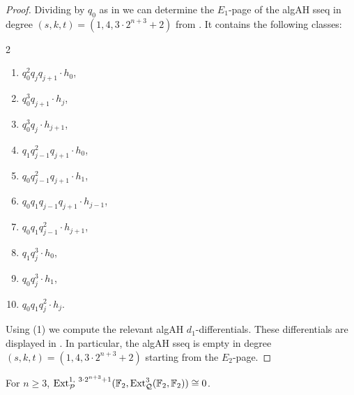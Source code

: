 \begin{proof}
  Dividing by $q_0$ as in  we can determine
  the $E_1$-page of the algAH sseq in degree $(s,k,t) = (1,4,3 \cdot 2^{n+3} + 2)$
  from .
  It contains the following classes:
  \begin{multicols}{2}
    \begin{enumerate}
    \item $q_0^2q_{j}q_{j+1} \cdot h_0$,
    \item $q_0^3q_{j+1} \cdot h_{j}$,
    \item $q_0^3q_{j} \cdot h_{j+1}$,
    \item $q_1q_{j-1}^2q_{j+1} \cdot h_0$,
    \item $q_0q_{j-1}^2q_{j+1} \cdot h_1$,
    \item $q_0q_1q_{j-1}q_{j+1} \cdot h_{j-1}$,
    \item $q_0q_1q_{j-1}^2 \cdot h_{j+1}$,
    \item $q_1q_{j}^3 \cdot h_{0}$,
    \item $q_0q_{j}^3 \cdot h_{1}$,
    \item $q_0q_1q_{j}^2 \cdot h_{j}$.
    \end{enumerate}
  \end{multicols}
  Using (1) we compute the relevant algAH $d_1$-differentials.
  These differentials are displayed in .
  In particular, the algAH sseq is empty in degree $(s,k,t) = (1,4,3 \cdot 2^{n+3} + 2)$ starting from the $E_2$-page.  
\end{proof}

\begin{lem}  \label{lem:skt131}
For $n\geq 3$,  $\operatorname{\mathrm{Ext}}^{1,\ 3\cdot 2^{n+3} + 1}_{\mathcal{P}}(\operatorname{\mathbb{F}}_2, \operatorname{\mathrm{Ext}}_{\mathcal{Q}}^3(\operatorname{\mathbb{F}}_2, \operatorname{\mathbb{F}}_2)) \cong 0$.
\end{lem}


